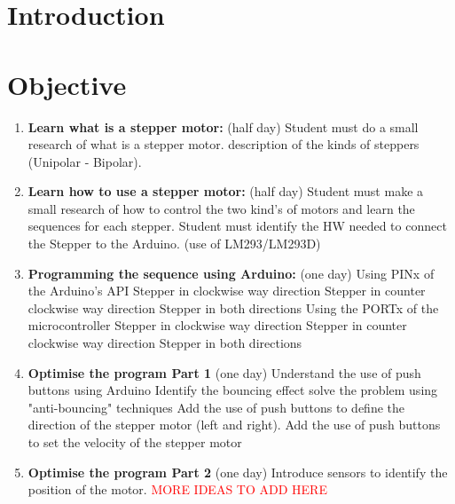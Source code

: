\section*{Introduction}


\section{Objective}
\begin{enumerate}
  \item \textbf{Learn what is a stepper motor:}  (half day)
  	\subitem Student must do a small research of what is a stepper motor.
  	\subitem description of the kinds of steppers (Unipolar - Bipolar).
  \item \textbf{Learn how to use a stepper motor:} (half day)
  	\subitem Student must make a small research of how to control the two kind’s of motors and learn the sequences for each stepper.
  	\subitem Student must identify the HW needed to connect the Stepper to the Arduino. (use of LM293/LM293D)
  \item \textbf{Programming the sequence using Arduino:} (one day)
  	\subitem Using PINx of the Arduino's API
  		\subsubitem Stepper in clockwise way direction
  		\subsubitem Stepper in counter clockwise way direction
  		\subsubitem Stepper in both directions
  	\subitem Using the PORTx of the microcontroller
  		\subsubitem Stepper in clockwise way direction
  		\subsubitem Stepper in counter clockwise way direction
  		\subsubitem Stepper in both directions
  \item \textbf{Optimise the program Part 1} (one day)
	\subitem Understand the use of push buttons using Arduino
		\subsubitem Identify the bouncing effect
		\subsubitem solve the problem using "anti-bouncing" techniques
  	\subitem Add the use of push buttons to define the direction of the stepper motor (left and right).
  	\subitem Add the use of push buttons to set the velocity of the stepper motor
  \item \textbf{Optimise the program Part 2} (one day)
  	\subitem Introduce sensors to identify the position of the motor.
  	\subitem \textcolor{red}{MORE IDEAS TO ADD HERE}


\end{enumerate}


